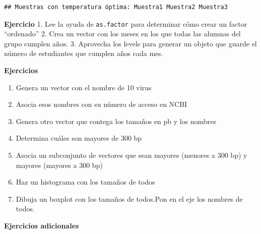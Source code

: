 \documentclass[
]{book}
\providecommand{\tightlist}{%
  \setlength{\itemsep}{0pt}\setlength{\parskip}{0pt}}
\begin{document}
\begin{verbatim}
## Muestras con temperatura óptima: Muestra1 Muestra2 Muestra3
\end{verbatim}

\textbf{Ejercicio}
1. Lee la ayuda de \texttt{as.factor} para determinar cómo crear un factor ``ordenado''
2. Crea un vector con los meses en los que todas las alumnas del grupo cumplen años.
3. Aprovecha los levels para generar un objeto que guarde el número de estudiantes que cumplen años cada mes.

\textbf{Ejercicios}

\begin{enumerate}
\def\labelenumi{\arabic{enumi}.}
\tightlist
\item
  Genera un vector con el nombre de 10 virus
\item
  Asocia esos nombres con su número de acceso en NCBI
\item
  Genera otro vector que contega los tamaños en pb y los nombres
\item
  Determina cuáles son mayores de 300 bp
\item
  Asocia un subconjunto de vectores que sean mayores (menores a 300 bp) y mayores (mayores a 300 bp)
\item
  Haz un histograma con los tamaños de todos
\item
  Dibuja un boxplot con los tamaños de todos.Pon en el eje los nombres de todos.
\end{enumerate}

\textbf{Ejercicios adicionales }
\end{document}
